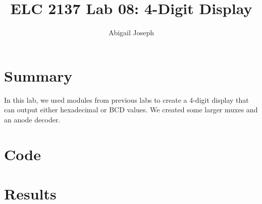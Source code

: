 \documentclass[11pt]{article}
\newcommand{\Verilog}[2][]{%
	
}
\begin{document}
\title{ELC 2137 Lab 08: 4-Digit Display}
\author{Abigail Joseph}

\maketitle


\section*{Summary}

In this lab, we used modules from previous labs to create a 4-digit display that can output either hexadecimal or BCD values. We created some larger muxes and an anode decoder.   

\section*{Code}

\Verilog[firstline=23, caption=Mux 2 ,label=code:file_1]{mux2.sv}
\Verilog[firstline=23, caption=Mux 2 Testbench ,label=code:file_2]{mux2_test.sv}
\Verilog[firstline=23, caption=Mux 4 ,label=code:file_3]{mux4.sv}
\Verilog[firstline=23, caption=Mux 4 Testbench ,label=code:file_4]{mux4_test.sv}
\Verilog[firstline=23, caption=Anode Decoder ,label=code:file_5]{an_decoder.sv}
\Verilog[firstline=23, caption=Anode Decoder Testbench ,label=code:file_6]{an_decoder_test.sv}
\Verilog[firstline=23, caption=Seven Segment 4 ,label=code:file_7]{sseg4.sv}
\Verilog[firstline=23, caption=Manual ,label=code:file_8]{sseg4_manual.sv}

\section*{Results}
\end{document}
